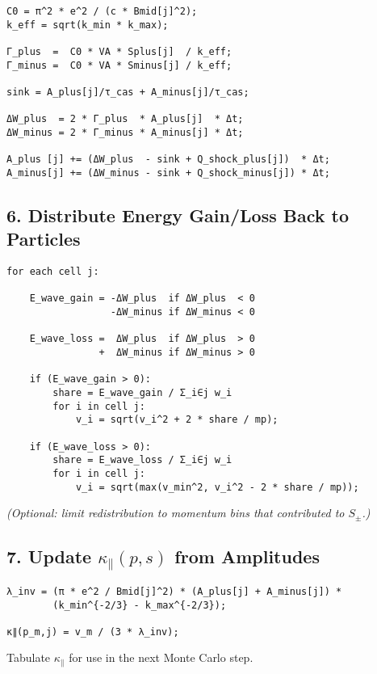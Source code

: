 \begin{lstlisting}
C0 = π^2 * e^2 / (c * Bmid[j]^2);
k_eff = sqrt(k_min * k_max);

Γ_plus  =  C0 * VA * Splus[j]  / k_eff;
Γ_minus =  C0 * VA * Sminus[j] / k_eff;

sink = A_plus[j]/τ_cas + A_minus[j]/τ_cas;

ΔW_plus  = 2 * Γ_plus  * A_plus[j]  * Δt;
ΔW_minus = 2 * Γ_minus * A_minus[j] * Δt;

A_plus [j] += (ΔW_plus  - sink + Q_shock_plus[j])  * Δt;
A_minus[j] += (ΔW_minus - sink + Q_shock_minus[j]) * Δt;
\end{lstlisting}

\subsection*{6. Distribute Energy Gain/Loss Back to Particles}

\begin{lstlisting}
for each cell j:

    E_wave_gain = -ΔW_plus  if ΔW_plus  < 0
                  -ΔW_minus if ΔW_minus < 0

    E_wave_loss =  ΔW_plus  if ΔW_plus  > 0
                +  ΔW_minus if ΔW_minus > 0

    if (E_wave_gain > 0):
        share = E_wave_gain / Σ_i∈j w_i
        for i in cell j:
            v_i = sqrt(v_i^2 + 2 * share / mp);

    if (E_wave_loss > 0):
        share = E_wave_loss / Σ_i∈j w_i
        for i in cell j:
            v_i = sqrt(max(v_min^2, v_i^2 - 2 * share / mp));
\end{lstlisting}

\textit{(Optional: limit redistribution to momentum bins that contributed to $S_\pm$.)}

\subsection*{7. Update $\kappa_\parallel(p,s)$ from Amplitudes}

\begin{lstlisting}
λ_inv = (π * e^2 / Bmid[j]^2) * (A_plus[j] + A_minus[j]) *
        (k_min^{-2/3} - k_max^{-2/3});

κ∥(p_m,j) = v_m / (3 * λ_inv);
\end{lstlisting}

Tabulate $\kappa_\parallel$ for use in the next Monte Carlo step.

